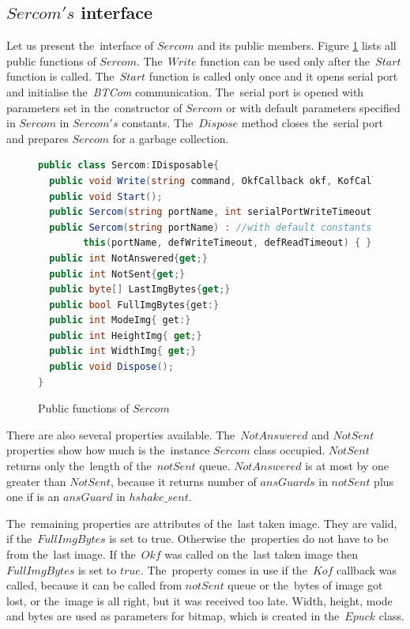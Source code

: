   \subsection{$Sercom's$ interface} %
  Let  us present the~interface of $Sercom$ and its public members.
  Figure \ref{publicser} lists all public functions of $Sercom$.
  The~$Write$ function can be used only
  after the~$Start$ function is called. The~$Start$ function is called only once and
  it opens serial port and initialise the~{\it BTCom} communication. 
  The~serial port is opened with parameters set in the~constructor of $Sercom$ or with
  default parameters specified in $Sercom$ in $Sercom's$ constants. The~$Dispose$ method closes the~serial port
  and prepares $Sercom$ for a garbage collection.

\begin{figure}[!hbp]
\begin{lstlisting}[language=cs]
public class Sercom:IDisposable{
  public void Write(string command, OkfCallback okf, KofCallback kof,object state, double timeout);
  public void Start();
  public Sercom(string portName, int serialPortWriteTimeout, int serialPortReadTimeout);
  public Sercom(string portName) : //with default constants
        this(portName, defWriteTimeout, defReadTimeout) { }
  public int NotAnswered{get;}
  public int NotSent{get;}
  public byte[] LastImgBytes{get;}
  public bool FullImgBytes{get:}
  public int ModeImg{ get:}
  public int HeightImg{ get;}
  public int WidthImg{ get;}
  public void Dispose();
}
\end{lstlisting}
\caption{Public functions of $Sercom$} \label{publicser}	
\end{figure}

  There are also several properties available. The~$NotAnswered$ and $NotSent$ properties
  show how much is the~instance $Sercom$ class occupied. $NotSent$ returns only the~length of the~$notSent$ queue. 
  $NotAnswered$ is at most by one greater than $NotSent$,
  because it returns number of $ansGuards$ in $notSent$ plus one if is an $ansGuard$ in $hshake\_sent$.

  The~remaining properties are attributes of the~last taken image. 
  They are valid, if the~$FullImgBytes$ is set to true.
  Otherwise the~properties do not have to be from the~last image.
  If the~$Okf$ was called on the~last taken image then $FullImgBytes$ is set to $true$. The~property
  comes in use if the~$Kof$ callback was called, because it can be called from $notSent$ queue 
  or the~bytes of image got lost, or the~image is all right, but it was received too late. 
  Width, height, mode and bytes are used as parameters for bitmap, 
  which is created in the~$Epuck$ class.

